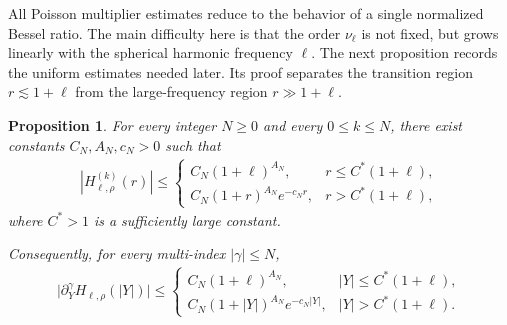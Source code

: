 \documentclass[12pt]{amsart}
\newtheorem{proposition}[theorem]{Proposition}
\begin{document}
All Poisson multiplier estimates reduce to the behavior of a single normalized Bessel ratio. The main difficulty here is that the order $\nu_\ell$ is not fixed, but grows linearly with the spherical harmonic frequency $\ell$. The next proposition records the uniform estimates needed later. Its proof separates the transition region $r\lesssim 1+\ell$ from the large-frequency region $r\gg1+\ell$.

\begin{proposition}\label{lem_transition_ratio_derivatives}
For every integer $N \ge 0$ and every $0\le k\le N$, there exist constants $C_N,A_N,c_N>0$ such that
\begin{align}\label{eq_transition_H_derivatives}
    |H_{\ell,\rho}^{(k)}(r)|
    \le \begin{cases}
        C_N(1+\ell)^{A_N}, & r \le C^*(1+\ell),\\[4pt]
        C_N(1+r)^{A_N}e^{-c_N r}, & r > C^*(1+\ell),
    \end{cases}
\end{align}
where $C^*>1$ is a sufficiently large constant.

Consequently, for every multi-index $|\gamma|\le N$,
\begin{align}\label{eq_transition_Y_derivatives}
\bigl|\partial_Y^\gamma H_{\ell,\rho}(|Y|)\bigr| \le \begin{cases}
    C_N (1+\ell)^{A_N}, & |Y|\le C^* (1+\ell),\\[4pt]
    C_N (1+|Y|)^{A_N}e^{-c_N|Y|}, & |Y|>C^*(1+\ell).
\end{cases}
\end{align}
\end{proposition}
\end{document}
